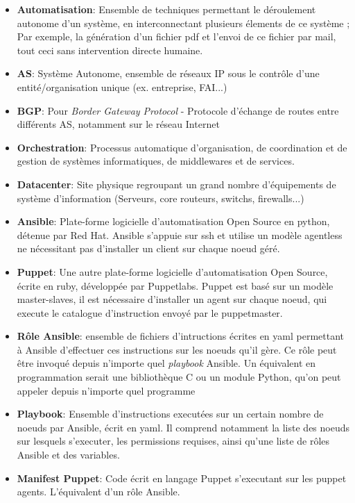 \documentclass[12 pt]{report}
\begin{document}
\begin{itemize}

\item{\textbf{Automatisation}}: Ensemble de techniques permettant le déroulement autonome d'un système, en interconnectant plusieurs élements de ce système ; Par exemple, la génération d'un fichier pdf et l'envoi de ce fichier par mail, tout ceci sans intervention directe humaine.

\item{\textbf{AS}}: Système Autonome, ensemble de réseaux IP sous le contrôle d'une entité/organisation unique (ex. entreprise, FAI...)

\item{\textbf{BGP}}: Pour \emph{Border Gateway Protocol} - Protocole d'échange de routes entre différents AS, notamment sur le réseau Internet

\item{\textbf{Orchestration}}: Processus automatique d'organisation, de coordination et de gestion de systèmes informatiques, de middlewares et de services.

\item{\textbf{Datacenter}}: Site physique regroupant un grand nombre d'équipements de système d'information (Serveurs, core routeurs, switchs, firewalls...)

\item{\textbf{Ansible}}: Plate-forme logicielle d'automatisation Open Source en python, détenue par Red Hat. Ansible s'appuie sur ssh et utilise un modèle agentless ne nécessitant pas d'installer un client sur chaque noeud géré.

\item{\textbf{Puppet}}: Une autre plate-forme logicielle d'automatisation Open Source, écrite en ruby, développée par Puppetlabs. Puppet est basé sur un modèle master-slaves, il est nécessaire d'installer un agent sur chaque noeud, qui execute le catalogue d'instruction envoyé par le puppetmaster.

\item{\textbf{Rôle Ansible}}: ensemble de fichiers d'intructions écrites en yaml permettant à Ansible d'effectuer ces instructions sur les noeuds qu'il gère. Ce rôle peut être invoqué depuis n'importe quel \emph{playbook} Ansible. Un équivalent en programmation serait une bibliothèque C ou un module Python, qu'on peut appeler depuis n'importe quel programme

\item{\textbf{Playbook}}: Ensemble d'instructions executées sur un certain nombre de noeuds par Ansible, écrit en yaml. Il comprend notamment la liste des noeuds sur lesquels s'executer, les permissions requises, ainsi qu'une liste de rôles Ansible et des variables.

\item{\textbf{Manifest Puppet}}: Code écrit en langage Puppet s'executant sur les puppet agents. L'équivalent d'un rôle Ansible.

\end{itemize}
\end{document}
